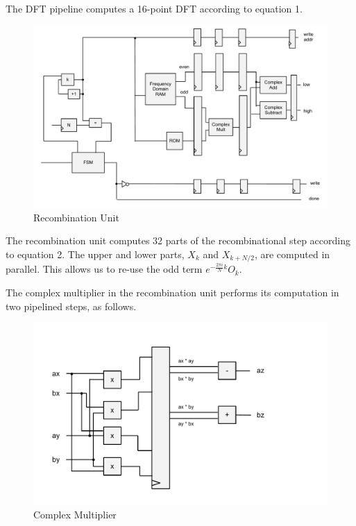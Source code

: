 \documentclass{article}
\begin{document}
	The DFT pipeline computes a 16-point DFT according to equation 1. 

	\begin{figure}[H]
		\centering
		\includegraphics[scale=0.3]{recombinator}
		\caption{Recombination Unit}
	\end{figure}
	
	The recombination unit computes 32 parts of the recombinational step 
	according to equation 2. The upper and lower parts, \(X_k\) and 
	\(X_{k + N / 2}\), are computed in parallel. This allows us to re-use the 
	odd term \(e^{-\frac{2\pi i}{N}k} O_k\).

	The complex multiplier in the recombination unit performs its computation
	in two pipelined steps, as follows.

	\begin{figure}[H]
		\centering
		\includegraphics[scale=0.3]{complex-mult}
		\caption{Complex Multiplier}
	\end{figure}
\end{document}
